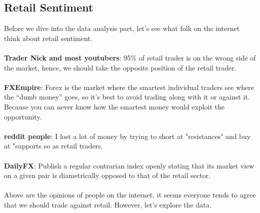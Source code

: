 \documentclass{article}
\begin{document}
\subsection{Retail Sentiment}
Before we dive into the data analysis part, let's see what folk on the internet think about retail sentiment. \\ \\ 
\textbf{Trader Nick and most youtubers}: 95\% of retail trader is on the wrong side of the market, hence, we should take the opposite position of the retail trader. \\ \\
\textbf{FXEmpire}: Forex is the market where the smartest individual traders see where the “dumb money” goes, so it's best to avoid trading along with it or against it. Because you can never know how the smartest money would exploit the opportunity. \\ \\
\textbf{reddit people}: I lost a lot of money by trying to short at "resistances" and buy at "supports so as retail traders. \\ \\
\textbf{DailyFX}: Publish a regular contrarian index openly stating that its market view on a given pair is diametrically opposed to that of the retail sector. \\ \\
Above are the opinions of people on the internet, it seems everyone tends to agree that we should trade against retail. However, let's explore the data. \\ \\ 
\end{document}
